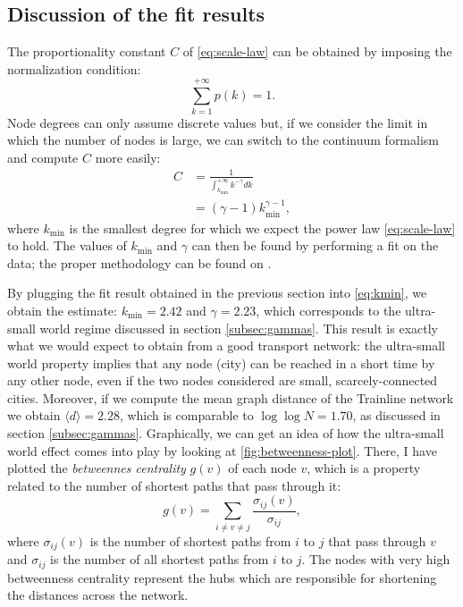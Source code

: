 \subsection{Discussion of the fit results}
The proportionality constant $C$ of \eqref{eq:scale-law} can be obtained by imposing the normalization condition:
\begin{equation*}
    \sum _{k=1}^{+\infty} p(k) = 1.
\end{equation*}
Node degrees can only assume discrete values but, if we consider the limit in which the number of nodes is large, we can switch to the continuum formalism and compute $C$ more easily:
\begin{equation}
    \begin{aligned}
        C &= \frac{1} {\int_{k_{\min}}^{+\infty} k^{-\gamma} dk} \\
          &= (\gamma -1) k_{\min} ^{\gamma-1},    
    \end{aligned}
    \label{eq:kmin}
\end{equation}
where $k_{\min}$ is the smallest degree for which we expect the power law \eqref{eq:scale-law} to hold. The values of $k_{\min}$ and $\gamma$ can then be found by performing a fit on the data; the proper methodology can be found on \cite{barabasi}.

By plugging the fit result obtained in the previous section into \eqref{eq:kmin}, we obtain the estimate: $k_{\min} = 2.42$ and $\gamma=2.23$, which corresponds to the ultra-small world regime discussed in section \ref{subsec:gammas}.
This result is exactly what we would expect to obtain from a good transport network: the ultra-small world property implies that any node (city) can be reached in a short time by any other node, even if the two nodes considered are small, scarcely-connected cities.
Moreover, if we compute the mean graph distance of the Trainline network we obtain $\langle d \rangle = 2.28$, which is comparable to $\log{} \log N = 1.70$, as discussed in section \ref{subsec:gammas}. Graphically, we can get an idea of how the ultra-small world effect comes into play by looking at \autoref{fig:betweenness-plot}. There, I have plotted the \emph{betweennes centrality} $g(v)$ of each node $v$, which is a property related to the number of shortest paths that pass through it:
\begin{equation*}
    g(v) = \sum_{i \neq v \neq j} \frac{\sigma_{ij}(v)}{\sigma_{ij}},
\end{equation*}
where $\sigma_{ij}(v)$ is the number of shortest paths from $i$ to $j$ that pass through $v$ and $\sigma_{ij}$ is the number of all shortest paths from $i$ to $j$.
The nodes with very high betweenness centrality represent the hubs which are responsible for shortening the distances across the network.

